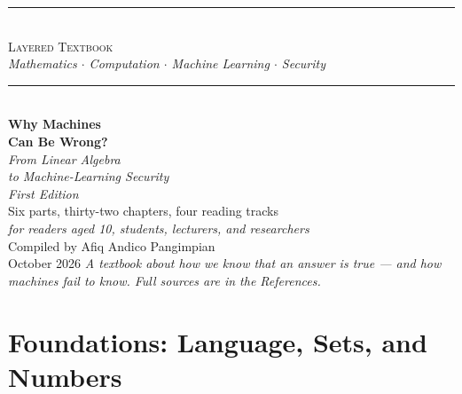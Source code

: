 



\frontmatter

\hypersetup{pageanchor=false}
\begin{titlepage}
\centering
\vspace*{1.6cm}
{\color{accent}\rule{\textwidth}{1.2pt}}\\[0.45cm]
{\large\scshape Layered Textbook}\\[0.15cm]
{\itshape Mathematics $\cdot$ Computation $\cdot$ Machine Learning $\cdot$ Security}\\[0.45cm]
{\color{accent}\rule{\textwidth}{0.6pt}}\\[1.8cm]
{\Huge\bfseries Why Machines\\[0.25cm] Can Be Wrong?}\\[0.7cm]
{\Large\itshape From Linear Algebra\\[0.18cm] to Machine-Learning Security}\\[0.7cm]
{\large\itshape First Edition}\\[0.5cm]
{\large Six parts, thirty-two chapters, four reading tracks}\\[0.35cm]
{\normalsize\itshape for readers aged 10, students, lecturers, and researchers}\\[2.0cm]
{\large Compiled by Afiq Andico Pangimpian}\\[0.3cm]
{\large October 2026}
\vfill
{\footnotesize\itshape A textbook about how we know that an answer is true --- and
how machines fail to know. Full sources are in the References.}
\end{titlepage}
\hypersetup{pageanchor=true}

\tableofcontents





\mainmatter

\part{Foundations: Language, Sets, and Numbers}

